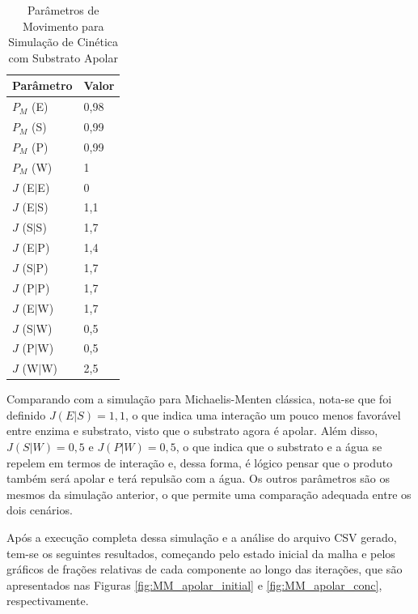 \documentclass[12pt,oneside]{report}
\begin{document}
\begin{table}[H]
    \centering
    \caption{Parâmetros de Movimento para Simulação de Cinética com Substrato Apolar}
    \vspace{0.2cm}
    \begin{tabularx}{\textwidth}{X m{5cm}}
        \hline
        \textbf{Parâmetro} & \textbf{Valor} \\
        \hline
        $P_M$ (E)          & 0{,}98         \\
        $P_M$ (S)          & 0{,}99         \\
        $P_M$ (P)          & 0{,}99         \\
        $P_M$ (W)          & 1              \\
        $J$ (E$|$E)        & 0              \\
        $J$ (E$|$S)        & 1{,}1          \\
        $J$ (S$|$S)        & 1{,}7          \\
        $J$ (E$|$P)        & 1{,}4          \\
        $J$ (S$|$P)        & 1{,}7          \\
        $J$ (P$|$P)        & 1{,}7          \\
        $J$ (E$|$W)        & 1{,}7          \\
        $J$ (S$|$W)        & 0{,}5          \\
        $J$ (P$|$W)        & 0{,}5          \\
        $J$ (W$|$W)        & 2{,}5          \\
        \hline
    \end{tabularx}
    \vspace{0.2cm}
    \label{tab:params_movimento_apolar}
\end{table}

Comparando com a simulação para Michaelis-Menten clássica, nota-se que foi definido $J (E|S) = 1{,}1$, o que indica uma interação um pouco menos favorável entre enzima e substrato, visto que o substrato agora é apolar. Além disso, $J (S|W) = 0{,}5$ e $J (P|W) = 0{,}5$, o que indica que o substrato e a água se repelem em termos de interação e, dessa forma, é lógico pensar que o produto também será apolar e terá repulsão com a água. Os outros parâmetros são os mesmos da simulação anterior, o que permite uma comparação adequada entre os dois cenários.

Após a execução completa dessa simulação e a análise do arquivo CSV gerado, tem-se os seguintes resultados, começando pelo estado inicial da malha e pelos gráficos de frações relativas de cada componente ao longo das iterações, que são apresentados nas Figuras \ref{fig:MM_apolar_initial} e \ref{fig:MM_apolar_conc}, respectivamente.
\end{document}

